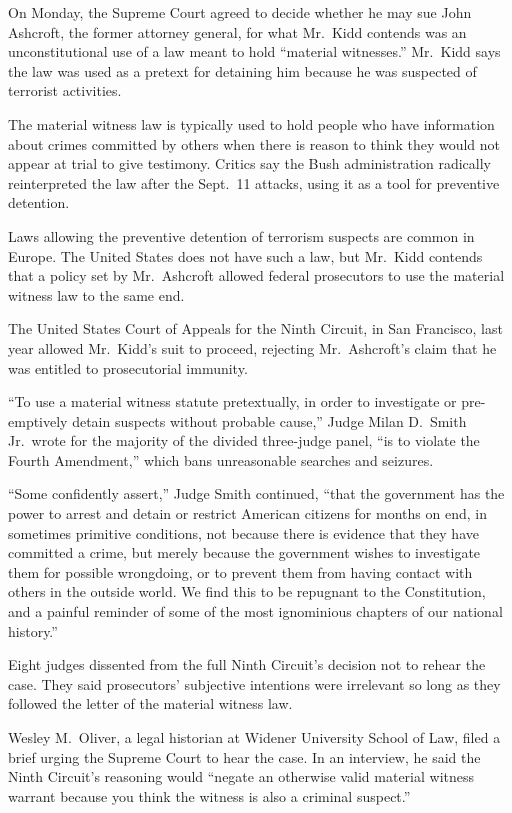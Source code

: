 ﻿\documentclass[12pt]{article}
\begin{document}
On Monday, the Supreme Court agreed to decide whether he may sue John Ashcroft, the former attorney
general, for what Mr.~Kidd contends was an unconstitutional use of a law meant to hold ``material
witnesses.'' Mr.~Kidd says the law was used as a pretext for detaining him because he was suspected
of terrorist activities.

The material witness law is typically used to hold people who have information about crimes
committed by others when there is reason to think they would not appear at trial to give testimony.
Critics say the Bush administration radically reinterpreted the law after the Sept.~11 attacks,
using it as a tool for preventive detention.

Laws allowing the preventive detention of terrorism suspects are common in Europe. The United States
does not have such a law, but Mr.~Kidd contends that a policy set by Mr.~Ashcroft allowed federal
prosecutors to use the material witness law to the same end.

The United States Court of Appeals for the Ninth Circuit, in San Francisco, last year allowed
Mr.~Kidd's suit to proceed, rejecting Mr.~Ashcroft's claim that he was entitled to prosecutorial
immunity.

``To use a material witness statute pretextually, in order to investigate or pre-emptively detain
suspects without probable cause,'' Judge Milan D.~Smith Jr.~wrote for the majority of the divided
three-judge panel, ``is to violate the Fourth Amendment,'' which bans unreasonable searches and
seizures.

``Some confidently assert,'' Judge Smith continued, ``that the government has the power to arrest
and detain or restrict American citizens for months on end, in sometimes primitive conditions, not
because there is evidence that they have committed a crime, but merely because the government wishes
to investigate them for possible wrongdoing, or to prevent them from having contact with others in
the outside world. We find this to be repugnant to the Constitution, and a painful reminder of some
of the most ignominious chapters of our national history.''

Eight judges dissented from the full Ninth Circuit's decision not to rehear the case. They said
prosecutors' subjective intentions were irrelevant so long as they followed the letter of the
material witness law.

Wesley M.~Oliver, a legal historian at Widener University School of Law, filed a brief urging the
Supreme Court to hear the case. In an interview, he said the Ninth Circuit's reasoning would
``negate an otherwise valid material witness warrant because you think the witness is also a
criminal suspect.''
\end{document}
